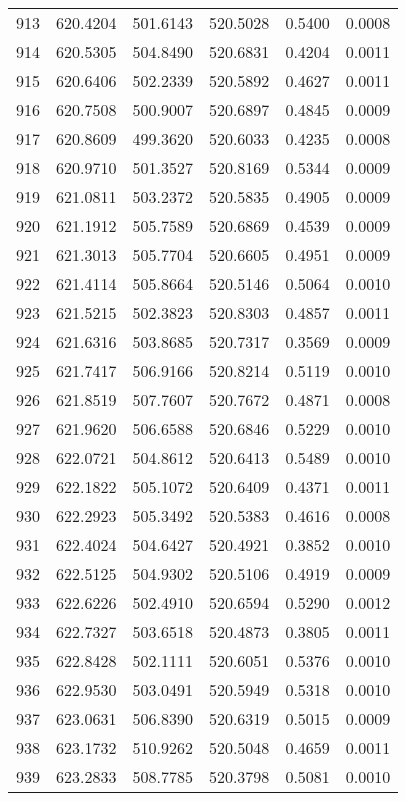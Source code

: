\documentclass{article}
\begin{document}
\begin{longtable}{|c|c|c|c|c|c|}
913 & 620.4204 & 501.6143 & 520.5028 & 0.5400 & 0.0008 \\
914 & 620.5305 & 504.8490 & 520.6831 & 0.4204 & 0.0011 \\
915 & 620.6406 & 502.2339 & 520.5892 & 0.4627 & 0.0011 \\
916 & 620.7508 & 500.9007 & 520.6897 & 0.4845 & 0.0009 \\
917 & 620.8609 & 499.3620 & 520.6033 & 0.4235 & 0.0008 \\
918 & 620.9710 & 501.3527 & 520.8169 & 0.5344 & 0.0009 \\
919 & 621.0811 & 503.2372 & 520.5835 & 0.4905 & 0.0009 \\
920 & 621.1912 & 505.7589 & 520.6869 & 0.4539 & 0.0009 \\
921 & 621.3013 & 505.7704 & 520.6605 & 0.4951 & 0.0009 \\
922 & 621.4114 & 505.8664 & 520.5146 & 0.5064 & 0.0010 \\
923 & 621.5215 & 502.3823 & 520.8303 & 0.4857 & 0.0011 \\
924 & 621.6316 & 503.8685 & 520.7317 & 0.3569 & 0.0009 \\
925 & 621.7417 & 506.9166 & 520.8214 & 0.5119 & 0.0010 \\
926 & 621.8519 & 507.7607 & 520.7672 & 0.4871 & 0.0008 \\
927 & 621.9620 & 506.6588 & 520.6846 & 0.5229 & 0.0010 \\
928 & 622.0721 & 504.8612 & 520.6413 & 0.5489 & 0.0010 \\
929 & 622.1822 & 505.1072 & 520.6409 & 0.4371 & 0.0011 \\
930 & 622.2923 & 505.3492 & 520.5383 & 0.4616 & 0.0008 \\
931 & 622.4024 & 504.6427 & 520.4921 & 0.3852 & 0.0010 \\
932 & 622.5125 & 504.9302 & 520.5106 & 0.4919 & 0.0009 \\
933 & 622.6226 & 502.4910 & 520.6594 & 0.5290 & 0.0012 \\
934 & 622.7327 & 503.6518 & 520.4873 & 0.3805 & 0.0011 \\
935 & 622.8428 & 502.1111 & 520.6051 & 0.5376 & 0.0010 \\
936 & 622.9530 & 503.0491 & 520.5949 & 0.5318 & 0.0010 \\
937 & 623.0631 & 506.8390 & 520.6319 & 0.5015 & 0.0009 \\
938 & 623.1732 & 510.9262 & 520.5048 & 0.4659 & 0.0011 \\
939 & 623.2833 & 508.7785 & 520.3798 & 0.5081 & 0.0010 \\

\end{longtable}
\end{document}
